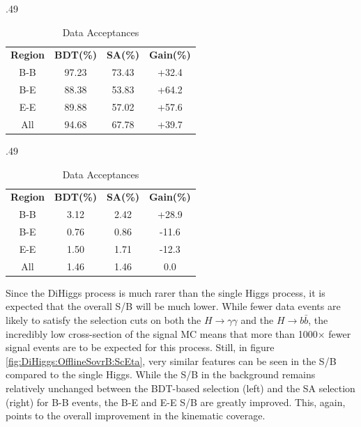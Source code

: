 \documentclass[12pt]{ucsddissertation}
\begin{document}
\begin{table}[h]
    \centering
    \caption{$HH \rightarrow b \bar{b} \gamma \gamma$ signal efficiencies and background acceptances for both offline selections, broken down by the location of each photon candidate in $\eta_{sc}$}
	\label{tab:DiHiggs:offlineTotalEffs}
    \begin{subtable}{.49\textwidth}
        \centering
        \caption{Signal Efficiencies}
        \begin{tabular}{|c|c|c|c|}
            \hline
            \textbf{Region} & \textbf{BDT(\%)} & \textbf{SA(\%)}& \textbf{Gain(\%)}\\
			\Xhline{2pt}
            B-B & 97.23 & 73.43 &+32.4\\ \hline
            B-E & 88.38 & 53.83 &+64.2\\ \hline
            E-E & 89.88 & 57.02 &+57.6\\ \hline
            All & 94.68 & 67.78 &+39.7\\ \hline
        \end{tabular}
    \end{subtable}
    \hfill
	\begin{subtable}{.49\textwidth}
        \centering
        \caption{Data Acceptances}
        \begin{tabular}{|c|c|c|c|}
            \hline
            \textbf{Region} & \textbf{BDT(\%)} & \textbf{SA(\%)} & \textbf{Gain(\%)}\\
			\Xhline{2pt}
            B-B & 3.12 & 2.42 &+28.9\\ \hline
            B-E & 0.76 & 0.86 &-11.6\\ \hline
            E-E & 1.50 & 1.71 &-12.3\\ \hline
            All & 1.46 & 1.46 &0.0\\ \hline
        \end{tabular}
    \end{subtable}
\end{table}

Since the DiHiggs process is much rarer than the single Higgs process, it is expected that the overall S/B will be much lower. While fewer data events are likely to satisfy the selection cuts on both the $H \rightarrow \gamma \gamma$ and the $H \rightarrow b \bar{b}$, the incredibly low cross-section of the signal MC means that more than 1000$\times$ fewer signal events are to be expected for this process. Still, in figure \ref{fig:DiHiggs:OfflineSovrB:ScEta}, very similar features can be seen in the S/B compared to the single Higgs. While the S/B in the background remains relatively unchanged between the BDT-based selection (left) and the SA selection (right) for B-B events, the B-E and E-E S/B are greatly improved. This, again, points to the overall improvement in the kinematic coverage. 
\end{document}
